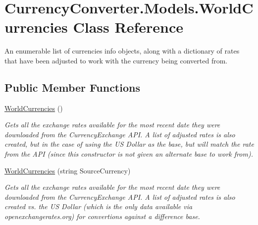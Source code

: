 \hypertarget{class_currency_converter_1_1_models_1_1_world_currencies}{\section{Currency\-Converter.\-Models.\-World\-Currencies Class Reference}
\label{class_currency_converter_1_1_models_1_1_world_currencies}
}


An enumerable list of currencies info objects, along with a dictionary of rates that have been adjusted to work with the currency being converted from.  


\subsection*{Public Member Functions}
\begin{DoxyCompactItemize}
\item 
\hyperlink{class_currency_converter_1_1_models_1_1_world_currencies_ab9f3c86f05f1c21bec84ef65bf392257}{World\-Currencies} ()
\begin{DoxyCompactList}\small\item\em Gets all the exchange rates available for the most recent date they were downloaded from the Currency\-Exchange A\-P\-I. A list of adjusted rates is also created, but in the case of using the U\-S Dollar as the base, but will match the rate from the A\-P\-I (since this constructor is not given an alternate base to work from). \end{DoxyCompactList}\item 
\hyperlink{class_currency_converter_1_1_models_1_1_world_currencies_ae66d9aa96b18e7a0afbe10f178a5018d}{World\-Currencies} (string Source\-Currency)
\begin{DoxyCompactList}\small\item\em Gets all the exchange rates available for the most recent date they were downloaded from the Currency\-Exchange A\-P\-I. A list of adjusted rates is also created vs. the U\-S Dollar (which is the only data available via openexchangerates.\-org) for convertions against a difference base. \end{DoxyCompactList}\end{DoxyCompactItemize}
